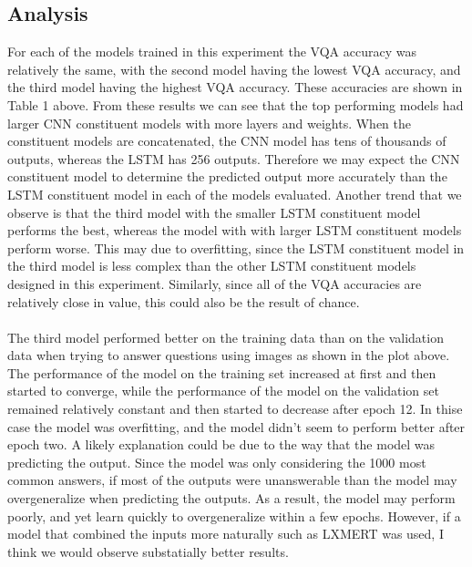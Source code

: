 \documentclass[12pt]{article}
\begin{document}
\subsection{Analysis}
For each of the models trained in this experiment the VQA accuracy was relatively the same, with the second model having the lowest VQA accuracy, and the third model having the highest VQA accuracy. These accuracies are shown in Table 1 above. From these results we can see that the top performing models had larger CNN constituent models with more layers and weights. When the constituent models are concatenated, the CNN model has tens of thousands of outputs, whereas the LSTM has 256 outputs. Therefore we may expect the CNN constituent model to determine the predicted output more accurately than the LSTM constituent model in each of the models evaluated. Another trend that we observe is that the third model with the smaller LSTM constituent model performs the best, whereas the model with with larger LSTM constituent models perform worse. This may due to overfitting, since the LSTM constituent model in the third model is less complex than the other LSTM constituent models designed in this experiment. Similarly, since all of the VQA accuracies are relatively close in value, this could also be the result of chance. \\
\\
The third model performed better on the training data than on the validation data when trying to answer questions using images as shown in the plot above. The performance of the model on the training set increased at first and then started to converge, while the performance of the model on the validation set remained relatively constant and then started to decrease after epoch 12. In thise case the model was overfitting, and the model didn't seem to perform better after epoch two. A likely explanation could be due to the way that the model was predicting the output. Since the model was only considering the 1000 most common answers, if most of the outputs were unanswerable than the model may overgeneralize when predicting the outputs. As a result, the model may perform poorly, and yet learn quickly to overgeneralize within a few epochs. However, if a model that combined the inputs more naturally such as LXMERT was used, I think we would observe substatially better results.
\end{document}
